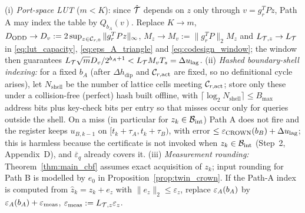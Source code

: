 \begin{remark}
\label{rem:lut_variants}
(i) \emph{Port-space LUT} (\(m < K\)): since \(\hat{\mathcal{T}}\) depends on \(z\) only through \(v = g_r^TPz\), Path A may index the table by \(Q_{b_A}(v)\). Replace \(K \to m\), \(D_{\mathrm{ODD}} \to D_v := 2\sup_{z\in\mathcal{C}_{r,0}}\|g_r^TPz\|_\infty\), \(M_z \to M_v := \|g_r^TP\|_2M_z\) and \(L_{\mathcal{T},z} \to L_{\mathcal{T}}\) in \eqref{eq:lut_capacity}, \eqref{eq:eps_A_triangle} and \eqref{eq:codesign_window}; the window then guarantees \(L_{\mathcal{T}}\sqrt{m}D_v/2^{b_A+1} < L_{\mathcal{T}}M_vT_s = \Delta u_{\mathrm{lag}}\). (ii) \emph{Hashed boundary-shell indexing:} for a fixed \(b_A\) (after \(\Delta h_{\mathrm{dip}}\) and \(\mathcal{C}_{r,\mathrm{act}}\) are fixed, so no definitional cycle arises), let \(N_{\mathrm{shell}}\) be the number of lattice cells meeting \(\mathcal{C}_{r,\mathrm{act}}\); store only these under a collision-free (perfect) hash built offline, with \(\lceil\log_2N_{\mathrm{shell}}\rceil \le B_{\max}\) address bits plus key-check bits per entry so that misses occur only for queries outside the shell. On a miss (in particular for \(z_k \in \mathcal{B}_{\mathrm{int}}\)) Path A does not fire and the register keeps \(u_{B,k-1}\) on \([t_k + \tau_A, t_k + \tau_B)\), with error \(\le \varepsilon_{\mathrm{CROWN}}(b_B) + \Delta u_{\mathrm{lag}}\); this is harmless because the certificate is not invoked when \(z_k \in \mathcal{B}_{\mathrm{int}}\) (Step~2, Appendix~D), and \(\overline{\varepsilon}_q\) already covers it. (iii) \emph{Measurement rounding:} Theorem~\ref{thm:main_cbf} assumes exact acquisition of \(z_k\); input rounding for Path B is modelled by \(e_0\) in Proposition~\ref{prop:twin_crown}. If the Path-A index is computed from \(\hat z_k = z_k + e_z\) with \(\|e_z\|_2 \le \varepsilon_z\), replace \(\varepsilon_A(b_A)\) by \(\varepsilon_A(b_A) + \varepsilon_{\mathrm{meas}}\), \(\varepsilon_{\mathrm{meas}} := L_{\mathcal{T},z}\varepsilon_z\).
\end{remark}

